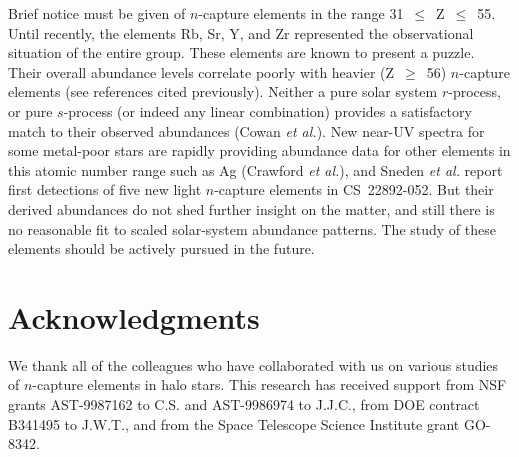\documentclass{ws-p8-50x6-00}
\begin{document}
Brief notice must be given of $n$-capture elements in the range 
31~$\leq$~Z~$\leq$~55.  
Until recently, the elements Rb, Sr, Y, and Zr represented the observational
situation of the entire group.  
These elements are known to present a puzzle.  
Their overall abundance levels correlate poorly with heavier (Z~$\geq$~56)
$n$-capture elements (see references cited previously).  
Neither a pure solar system $r$-process, or pure $s$-process 
(or indeed any linear combination) provides a satisfactory match to their 
observed abundances (Cowan {\it et al.}\cite{Co95}).  
New near-UV spectra for some metal-poor stars are rapidly providing 
abundance data for other elements in this atomic number range such as Ag 
(Crawford {\it et al.}\cite{Cr98}), and Sneden {\it et al.}\cite{Sn00}
report first detections of five new light $n$-capture elements in 
CS~22892-052. 
But their derived abundances do not shed further insight on the matter, and 
still there is no reasonable fit to scaled solar-system abundance patterns.  
The study of these elements should be actively pursued in the future. 




\section*{Acknowledgments}
We thank all of the colleagues who have collaborated with us on various
studies of $n$-capture elements in halo stars.
This research has received support from NSF grants AST-9987162 to C.S. and
AST-9986974 to J.J.C., from DOE contract B341495 to J.W.T., and from the Space
Telescope Science Institute grant GO-8342.
\end{document}
